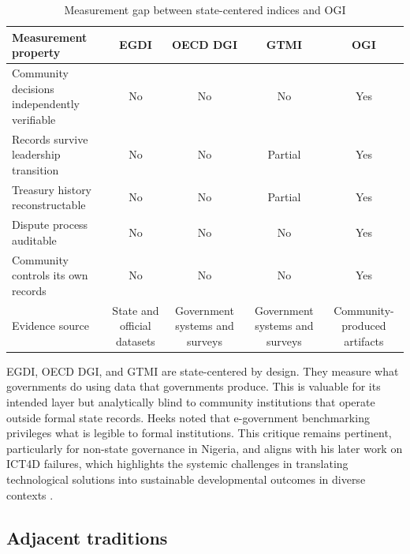 \documentclass[sigconf,anonymous]{acmart}
\begin{document}
\begin{table}[t]
\caption{Measurement gap between state-centered indices and OGI}
\label{tab:gap}
\small
\begin{tabularx}{\textwidth}{Ycccc}
\toprule
Measurement property & EGDI & OECD DGI & GTMI & OGI \\
\midrule
Community decisions independently verifiable & No & No & No & Yes \\
Records survive leadership transition & No & No & Partial & Yes \\
Treasury history reconstructable & No & No & Partial & Yes \\
Dispute process auditable & No & No & No & Yes \\
Community controls its own records & No & No & No & Yes \\
Evidence source & State and official datasets & Government systems and surveys & Government systems and surveys & Community-produced artifacts \\
\bottomrule
\end{tabularx}
\end{table}


EGDI, OECD DGI, and GTMI are state-centered by design. They measure what governments do using data that governments produce. This is valuable for its intended layer but analytically blind to community institutions that operate outside formal state records. Heeks \cite{heeks2006} noted that e-government benchmarking privileges what is legible to formal institutions. This critique remains pertinent, particularly for non-state governance in Nigeria, and aligns with his later work on ICT4D failures, which highlights the systemic challenges in translating technological solutions into sustainable developmental outcomes in diverse contexts \cite{heeks2002, heeks2003}.

\subsection{Adjacent traditions}
\end{document}
